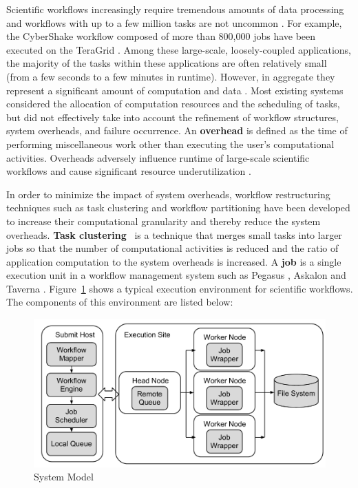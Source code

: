 Scientific workflows increasingly require tremendous amounts of data processing and workflows with up to a few million tasks are not uncommon \cite{Callaghan2011}. For example, the CyberShake workflow \cite{Rynge2012} composed of more than 800,000 jobs have been executed on the TeraGrid \cite{TeraGrid}. Among these large-scale, loosely-coupled applications, the majority of the tasks within these applications are often relatively small (from a few seconds to a few minutes in runtime). However, in aggregate they represent a significant amount of computation and data \cite{Deelman2002}. Most existing systems considered the allocation of computation resources and the scheduling of tasks, but did not effectively take into account the refinement of workflow structures, system overheads, and failure occurrence.
An \textbf{overhead} is defined as the time of performing miscellaneous work other than executing the user's computational activities. Overheads adversely influence runtime of large-scale scientific workflows and cause significant resource underutilization \cite{Chen2011}. 

In order to minimize the impact of system overheads, workflow restructuring techniques such as task clustering \cite{Singh2008,Hussin2010,Zhao2009} and workflow partitioning \cite{Kumar2002, Hedayat2009} have been developed to increase their computational granularity and thereby reduce the system overheads. \textbf{Task clustering}~\cite{Singh2008} is a technique that merges small tasks into larger jobs so that the number of computational activities is reduced and the ratio of application computation to the system overheads is increased. A \textbf{job} is a single execution unit in a workflow management system such as Pegasus \cite{Deelman2004}, Askalon \cite{Ostermann2009b} and Taverna \cite{Calasanz2008}. 
Figure~\ref{fig:model_system} shows a typical execution environment for scientific workflows. The components of this environment are listed below: 

\begin{figure}[h!]
\centering
  \includegraphics[width=0.7\linewidth]{figures/model/model.pdf}
  \caption{System Model}
  \label{fig:model_system}
\end{figure}

